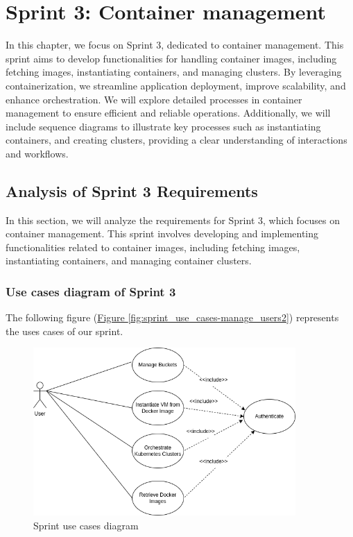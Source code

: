 \chapter{Sprint 3: Container management}
In this chapter, we focus on Sprint 3, dedicated to container management.
This sprint aims to develop functionalities for handling container images,
including fetching images, instantiating containers, and managing clusters.
By leveraging containerization, we streamline application deployment, improve scalability, and enhance orchestration.
We will explore detailed processes in container management to ensure efficient and reliable operations.
Additionally, we will include sequence diagrams to illustrate key processes such as instantiating containers, and creating clusters, providing a clear understanding of interactions and workflows.


\pagebreak

\section{Analysis of Sprint 3 Requirements}
In this section, we will analyze the requirements for Sprint 3, which focuses on container management. This sprint involves developing and implementing functionalities related to container images, including fetching images, instantiating containers, and managing container clusters. 

\subsection{Use cases diagram of Sprint 3}

The following figure (\hyperref[fig:sprint_use_cases]{Figure \ref{fig:sprint_use_cases-manage_users2}})  represents the uses cases of our sprint.
\begin{figure}[h]
  \center
  \includegraphics[width=10cm]{./chapters/sprint3/sprint_use_cases.png}
  \caption{Sprint use cases diagram}
  \label{fig:sprint_use_cases}
\end{figure}

